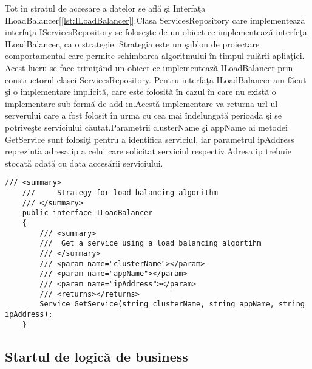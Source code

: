 \documentclass[a4paper,12pt]{report}
\let\oldref\ref
\renewcommand{\ref}[1]{[\oldref{#1}]}
\begin{document}
Tot \^in stratul de accesare a datelor se afl\u a \c si Interfa\c ta ILoadBalancer\ref{lst:ILoadBalancer}.Clasa ServicesRepository care implementeaz\u a
interfa\c ta IServicesRepository se folose\c ste de un obiect ce implementeaz\u a interfe\c ta ILoadBalancer, ca o strategie.
Strategia este un \c sablon de proiectare comportamental care permite schimbarea algoritmului \^in timpul rul\u arii aplia\c tiei.
Acest lucru se face trimi\c t\^and un obiect ce implementeaz\u a ILoadBalancer prin constructorul clasei ServicesRepository.
Pentru interfa\c ta ILoadBalancer am f\u acut \c si o implementare implicit\u a, care este folosit\u a \^in cazul \^in care nu exist\u a o implementare sub form\u a de 
add-in.Acest\u a implementare va returna url-ul serverului care a fost folosit \^in urma cu cea mai \^indelungat\u a perioad\u a \c si se potrive\c ste 
serviciului c\u autat.Parametrii clusterName \c si appName ai metodei GetService sunt folosi\c ti pentru a identifica serviciul,
iar  parametrul ipAddress reprezint\u a adresa ip a celui care solicitat serviciul respectiv.Adresa ip trebuie stocat\u a odat\u a
cu data acces\u arii serviciului.

\begin{lstlisting}[caption={Interfa\c ta ILoadBalancer},label={lst:ILoadBalancer}, breaklines]	
    /// <summary>
    ///     Strategy for load balancing algorithm
    /// </summary>
    public interface ILoadBalancer
    {
        /// <summary>
        ///  Get a service using a load balancing algortihm
        /// </summary>
        /// <param name="clusterName"></param>
        /// <param name="appName"></param>
        /// <param name="ipAddress"></param>
        /// <returns></returns>
        Service GetService(string clusterName, string appName, string ipAddress);
    }
\end{lstlisting}

\pagebreak

\subsection{Startul de logic\u a de business}
\end{document}
